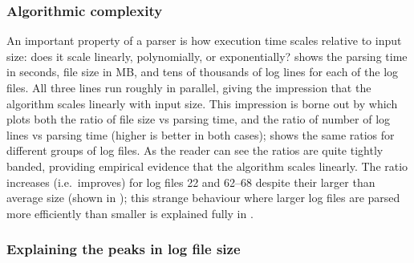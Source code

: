 \subsubsection{Algorithmic complexity}

An important property of a parser is how execution time scales relative to
input size: does it scale linearly, polynomially, or exponentially?
 shows the
parsing time in seconds, file size in MB, and tens of thousands of log
lines for each of the \numberOFlogFILES{} log files.  All three lines run
roughly in parallel, giving the impression that the algorithm scales
linearly with input size.  This impression is borne out by
 which plots
both the ratio of file size vs parsing time, and the ratio of number of log
lines vs parsing time (higher is better in both cases);  shows the same ratios for
different groups of log files.  As the reader can see the ratios are quite
tightly banded, providing empirical evidence that the algorithm scales
linearly.  The ratio increases (i.e.\ improves) for log files 22 and 62--68
despite their larger than average size (shown in ); this strange behaviour where larger
log files are parsed more efficiently than smaller is explained fully in
.  




\subsubsection{Explaining the peaks in log file size}

\label{Explaining the peaks in log file size}

